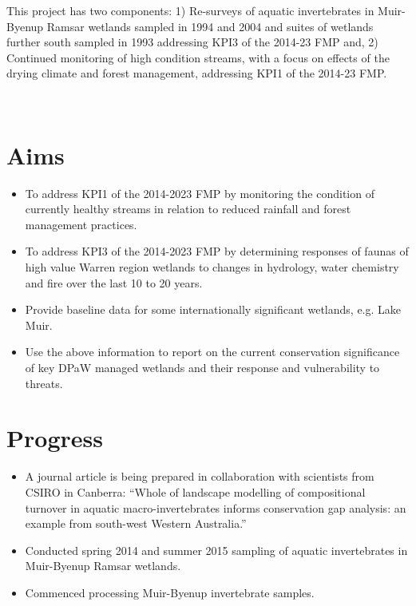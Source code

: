 \documentclass[version=last, 
    paper=a4, %
    10pt, %
    usenames,
    dvipsnames, 
    oneside, %
    headings=openany, %
    DIV=15 %
]{scrbook}
\begin{document}
This project has two components: 1) Re-surveys of aquatic invertebrates
in Muir-Byenup Ramsar wetlands sampled in 1994 and 2004 and suites of
wetlands further south sampled in 1993 addressing KPI3 of the 2014-23
FMP and, 2) Continued monitoring of high condition streams, with a focus
on effects of the drying climate and forest management, addressing KPI1
of the 2014-23 FMP.

~



\section*{Aims}
\begin{itemize}
\item
  To address KPI1 of the 2014-2023 FMP by monitoring the condition of
  currently healthy streams in relation to reduced rainfall and forest
  management practices.
\item
  To address KPI3 of the 2014-2023 FMP by determining responses of
  faunas of high value Warren region wetlands to changes in hydrology,
  water chemistry and fire over the last 10 to 20 years.
\item
  Provide baseline data for some internationally significant wetlands,
  e.g. Lake Muir.
\item
  Use the above information to report on the current conservation
  significance of key DPaW managed wetlands and their response and
  vulnerability to threats.
\end{itemize}



\section*{Progress}
\begin{itemize}
\itemsep1pt\parskip0pt
\item
  A journal article is being prepared in collaboration with scientists
  from CSIRO in Canberra: ``Whole of landscape modelling of
  compositional turnover in aquatic macro-invertebrates informs
  conservation gap analysis: an example from south-west Western
  Australia.''
\item
  Conducted spring 2014 and summer 2015 sampling of aquatic
  invertebrates in Muir-Byenup Ramsar wetlands.
\item
  Commenced processing Muir-Byenup invertebrate samples.
\end{itemize}
\end{document}
